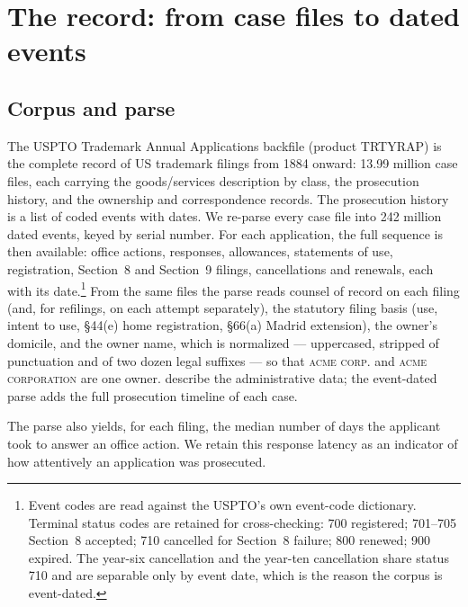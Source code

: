 \section{The record: from case files to dated events}\label{sec:record}

\subsection{Corpus and parse}

The USPTO Trademark Annual Applications backfile (product TRTYRAP) is the
complete record of US trademark filings from 1884 onward: 13.99 million
case files, each carrying the goods/services description by class, the
prosecution history, and the ownership and correspondence records. The
prosecution history is a list of coded events with dates. We
re-parse every case file into 242 million dated events, keyed by serial
number. For each application, the full sequence is then available: office
actions, responses, allowances, statements of use,
registration, Section~8 and Section~9 filings, cancellations and
renewals, each with its
date.\footnote{Event codes are read against the USPTO's own event-code
dictionary. Terminal status codes are retained for cross-checking: 700
registered; 701--705 Section~8 accepted; 710 cancelled for Section~8
failure; 800 renewed; 900 expired. The year-six cancellation and the
year-ten cancellation share status 710 and are separable only by event
date, which is the reason the corpus is event-dated.} From the same files
the parse reads counsel of record on each filing (and, for refilings, on
each attempt separately), the statutory filing basis (use, intent to use,
\S44(e) home registration, \S66(a) Madrid extension), the owner's
domicile, and the owner name, which is normalized --- uppercased,
stripped of punctuation and of two dozen legal suffixes --- so that
\textsc{acme corp.} and \textsc{acme corporation} are one owner.
\citet{Graham2013} describe the administrative data; the event-dated
parse adds the full prosecution timeline of each case.

The parse also yields, for each filing, the median number of days the
applicant took to answer an office action. We retain this response
latency as an indicator of how attentively an application was
prosecuted.
